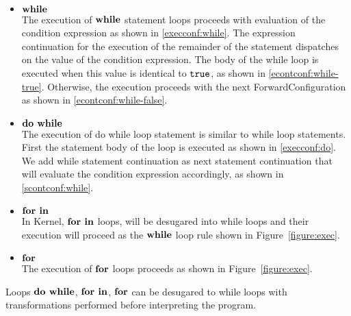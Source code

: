 \documentclass[a4paper,oneside]{article}
\newcommand{\synt}[1]{\ensuremath{\text{\textbf{#1}}}}
\DeclareMathOperator{\dowhile}{\synt{do~while}}
\DeclareMathOperator{\while}{\synt{while}}
\DeclareMathOperator{\forin}{\synt{for~in}}
\DeclareMathOperator{\for}{\synt{for}}
\begin{document}
\begin{itemize}
    \item  $\while$\\
        The execution of  $\while$ statement loops proceeds with evaluation of the condition expression as shown in \eqref{execconf:while}.
        The expression continuation for the execution of the remainder of the statement dispatches on the value of the condition expression.
        The body of the while loop is executed when this value is identical to $\tt{true}$, as shown in \eqref{econtconf:while-true}.
        Otherwise, the execution proceeds with the next ForwardConfiguration as shown in \eqref{econtconf:while-false}.

    \item $\dowhile$\\
        The execution of do while loop statement is similar to while loop statements.
        First the statement body of the loop is executed as shown in \eqref{execconf:do}.
        We add while statement continuation as next statement continuation that will evaluate the condition expression accordingly, as shown in \eqref{scontconf:while}.

    \item $\forin$\\
        In Kernel, $\forin$ loops, will be desugared into while loops and their execution will proceed as the $\while$ loop rule shown in Figure~\ref{figure:exec}.

    \item $\for$\\
        The execution of $\for$ loops proceeds as shown in Figure~\ref{figure:exec}.

\end{itemize}

Loops $\dowhile$, $\forin$, $\for$ can be desugared to while loops with transformations performed before interpreting the program.
\end{document}
